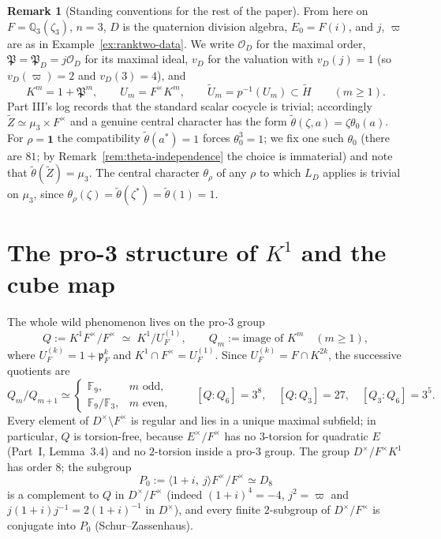 \documentclass[11pt]{article}
\newcommand{\Q}{\mathbb Q}
\newcommand{\Fq}{\mathbb F}
\newcommand{\tH}{\widetilde H}
\newcommand{\tZ}{\widetilde Z}
\newcommand{\tU}{\widetilde U}
\newcommand{\tth}{\widetilde\theta}
\newcommand{\Ocal}{\mathcal O}
\newcommand{\Pfr}{\mathfrak P}
\newcommand{\pfr}{\mathfrak p}
\theoremstyle{plain}
\theoremstyle{definition}
\newtheorem{remark}[theorem]{Remark}
\begin{document}
\begin{remark}[Standing conventions for the rest of the paper]\label{rem:conventions}
From here on $F=\Q_3(\zeta_3)$, $n=3$, $D$ is the quaternion division
algebra, $E_0=F(i)$, and $j$, $\varpi$ are as in
Example~\ref{ex:ranktwo-data}.  We write $\Ocal_D$ for the maximal
order, $\Pfr=\Pfr_D=j\Ocal_D$ for its maximal ideal, $v_D$ for the
valuation with $v_D(j)=1$ (so $v_D(\varpi)=2$ and $v_D(3)=4$), and
\[
 K^m=1+\Pfr^m,\qquad U_m=F^\times K^m,\qquad \tU_m=p^{-1}(U_m)\subset\tH
 \qquad(m\ge1).
\]
Part III's log records that the standard scalar cocycle is trivial;
accordingly $\tZ\simeq\mu_3\times F^\times$ and a genuine central
character has the form $\tth(\zeta,a)=\zeta\theta_0(a)$.  For
$\rho=\mathbf1$ the compatibility $\tth(a^*)=1$ forces
$\theta_0^3=1$; we fix one such $\theta_0$ (there are $81$; by
Remark~\ref{rem:theta-independence} the choice is immaterial) and
note that $\tth(\tZ)=\mu_3$.  The central character $\theta_\rho$
of any $\rho$ to which $L_D$ applies is trivial on $\mu_3$, since
$\theta_\rho(\zeta)=\tth(\zeta^*)=\tth(1)=1$.
\end{remark}

\section{The pro-3 structure of $K^1$ and the cube map}\label{sec:depth}
The whole wild phenomenon lives on the pro-$3$ group
\[
 Q:=K^1F^\times/F^\times\;\simeq\;K^1/U_F^{(1)},\qquad
 Q_m:=\text{image of }K^m\quad(m\ge1),
\]
where $U_F^{(k)}=1+\pfr_F^k$ and $K^1\cap F^\times=U_F^{(1)}$.
Since $U_F^{(k)}=F\cap K^{2k}$, the successive quotients are
\begin{equation}\label{eq:Qgraded}
 Q_m/Q_{m+1}\simeq\begin{cases}\Fq_9,&m\text{ odd},\\ \Fq_9/\Fq_3,&m\text{ even},\end{cases}
 \qquad [Q:Q_6]=3^8,\quad [Q:Q_3]=27,\quad [Q_3:Q_6]=3^5 .
\end{equation}
Every element of $D^\times\setminus F^\times$ is regular and lies in a
unique maximal subfield; in particular, $Q$ is torsion-free, because
$E^\times/F^\times$ has no $3$-torsion for quadratic $E$ (Part~I,
Lemma~3.4) and no $2$-torsion inside a pro-$3$ group.
The group $D^\times/F^\times K^1$ has order $8$; the subgroup
\begin{equation}\label{eq:P0}
 P_0:=\langle 1+i,\ j\rangle F^\times/F^\times\simeq D_8
\end{equation}
is a complement to $Q$ in $D^\times/F^\times$ (indeed $(1+i)^4=-4$,
$j^2=\varpi$ and $j(1+i)j^{-1}=2(1+i)^{-1}$ in $D^\times$), and every
finite $2$-subgroup of $D^\times/F^\times$ is conjugate into $P_0$
(Schur--Zassenhaus).
\end{document}
